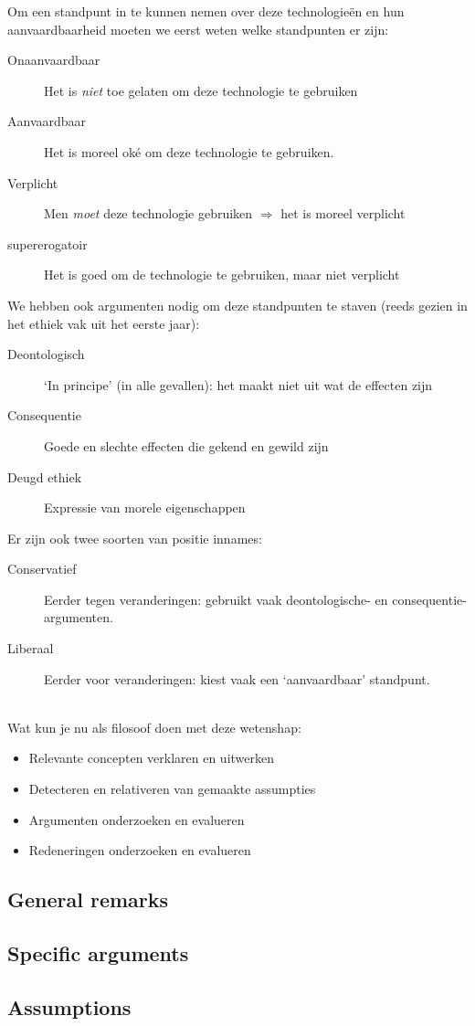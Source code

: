 \documentclass[../summary.tex]{subfiles}
\begin{document}
			Om een standpunt in te kunnen nemen over deze technologieën en hun aanvaardbaarheid moeten we eerst weten welke standpunten er zijn: 
			\begin{description}
				\item[Onaanvaardbaar] Het is \emph{niet} toe gelaten om deze technologie te gebruiken
				\item[Aanvaardbaar] Het is moreel oké om deze technologie te gebruiken. 
				\item[Verplicht] Men \emph{moet} deze technologie gebruiken $\Rightarrow$ het is moreel verplicht
				\item[supererogatoir] Het is goed om de technologie te gebruiken, maar niet verplicht
			\end{description} 
			We hebben ook argumenten nodig om deze standpunten te staven (reeds gezien in het ethiek vak uit het eerste jaar):
			\begin{description}
				\item[Deontologisch] `In principe' (in alle gevallen): het maakt niet uit wat de effecten zijn
				\item[Consequentie] Goede en slechte effecten die gekend en gewild zijn
				\item[Deugd ethiek] Expressie van morele eigenschappen
			\end{description}
			Er zijn ook twee soorten van positie innames:
			\begin{description}
				\item[Conservatief] Eerder tegen veranderingen: gebruikt vaak deontologische- en consequentie-argumenten.  
				\item[Liberaal] Eerder voor veranderingen: kiest vaak een `aanvaardbaar' standpunt. 
			\end{description}
			\mbox{}\\
			Wat kun je nu als filosoof doen met deze wetenshap: 
			\begin{itemize}
				\item Relevante concepten verklaren en uitwerken
				\item Detecteren en relativeren van gemaakte assumpties
				\item Argumenten onderzoeken en evalueren
				\item Redeneringen onderzoeken en evalueren
			\end{itemize}
		\subsection{General remarks}
		\subsection{Specific arguments}
		\subsection{Assumptions}
		
\end{document}
